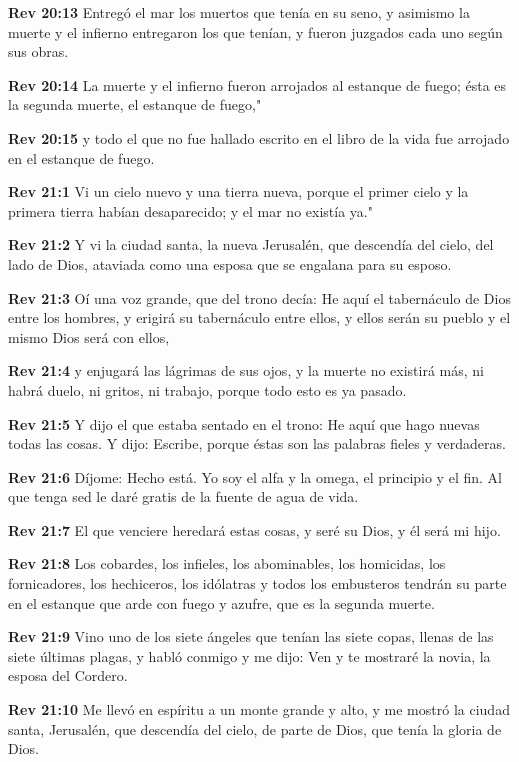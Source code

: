 \textbf{Rev 20:13} Entregó el mar los muertos que tenía en su seno, y asimismo la muerte y el infierno entregaron los que tenían, y fueron juzgados cada uno según sus obras. 

\textbf{Rev 20:14} La muerte y el infierno fueron arrojados al estanque de fuego; ésta es la segunda muerte, el estanque de fuego," 

\textbf{Rev 20:15} y todo el que no fue hallado escrito en el libro de la vida fue arrojado en el estanque de fuego. 

\textbf{Rev 21:1} Vi un cielo nuevo y una tierra nueva, porque el primer cielo y la primera tierra habían desaparecido; y el mar no existía ya." 

\textbf{Rev 21:2} Y vi la ciudad santa, la nueva Jerusalén, que descendía del cielo, del lado de Dios, ataviada como una esposa que se engalana para su esposo. 

\textbf{Rev 21:3} Oí una voz grande, que del trono decía: He aquí el tabernáculo de Dios entre los hombres, y erigirá su tabernáculo entre ellos, y ellos serán su pueblo y el mismo Dios será con ellos, 

\textbf{Rev 21:4} y enjugará las lágrimas de sus ojos, y la muerte no existirá más, ni habrá duelo, ni gritos, ni trabajo, porque todo esto es ya pasado. 

\textbf{Rev 21:5} Y dijo el que estaba sentado en el trono: He aquí que hago nuevas todas las cosas. Y dijo: Escribe, porque éstas son las palabras fieles y verdaderas. 

\textbf{Rev 21:6} Díjome: Hecho está. Yo soy el alfa y la omega, el principio y el fin. Al que tenga sed le daré gratis de la fuente de agua de vida. 

\textbf{Rev 21:7} El que venciere heredará estas cosas, y seré su Dios, y él será mi hijo. 

\textbf{Rev 21:8} Los cobardes, los infieles, los abominables, los homicidas, los fornicadores, los hechiceros, los idólatras y todos los embusteros tendrán su parte en el estanque que arde con fuego y azufre, que es la segunda muerte. 

\textbf{Rev 21:9} Vino uno de los siete ángeles que tenían las siete copas, llenas de las siete últimas plagas, y habló conmigo y me dijo: Ven y te mostraré la novia, la esposa del Cordero. 

\textbf{Rev 21:10} Me llevó en espíritu a un monte grande y alto, y me mostró la ciudad santa, Jerusalén, que descendía del cielo, de parte de Dios, que tenía la gloria de Dios. 

